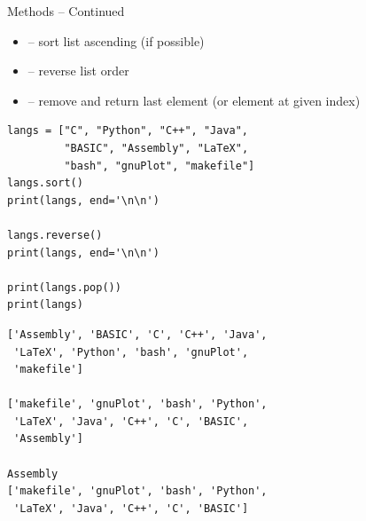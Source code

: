 \begin{frame}[fragile]{Methods -- Continued}
%
\vspace{-3pt}
\begin{itemize}
\item {} -- sort list ascending (if possible)
\item {} -- reverse list order
\item {} -- remove and return last element (or element at given index)
\end{itemize}
%
\vspace{3pt}
\begin{tcbraster}[raster columns=2,
                  raster equal height,
                  nobeforeafter,
                  raster column skip=0.5cm]
\begin{codebox}
\begin{verbatim}
langs = ["C", "Python", "C++", "Java",
         "BASIC", "Assembly", "LaTeX",
         "bash", "gnuPlot", "makefile"]
langs.sort()
print(langs, end='\n\n')

langs.reverse()
print(langs, end='\n\n')

print(langs.pop())
print(langs)
\end{verbatim}
\end{codebox}
%
\begin{cmdbox}
\begin{verbatim}
['Assembly', 'BASIC', 'C', 'C++', 'Java', 
 'LaTeX', 'Python', 'bash', 'gnuPlot', 
 'makefile']
 
['makefile', 'gnuPlot', 'bash', 'Python',
 'LaTeX', 'Java', 'C++', 'C', 'BASIC',
 'Assembly']

Assembly
['makefile', 'gnuPlot', 'bash', 'Python',
 'LaTeX', 'Java', 'C++', 'C', 'BASIC']

\end{verbatim}
\end{cmdbox}
\end{tcbraster}
%
\end{frame}